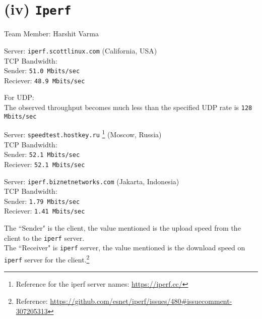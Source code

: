 \documentclass[11pt, fleqn]{article}
\begin{document}
\newpage
\section*{(iv) \texttt{Iperf}}
\label{partd}
\setcounter{equation}{0}

Team Member: Harshit Varma

\hrulefill
\smallskip


Server: \texttt{iperf.scottlinux.com} (California, USA)\\
TCP Bandwidth:\\
Sender: \texttt{51.0 Mbits/sec}\\
Reciever: \texttt{48.9 Mbits/sec}

For UDP:\\
The observed throughput becomes much less than the specified UDP rate is \texttt{128 Mbits/sec}

\hrulefill
\smallskip

Server: \texttt{speedtest.hostkey.ru} \footnote{Reference for the iperf server names: \url{https://iperf.cc/}} (Moscow, Russia)\\
TCP Bandwidth:\\
Sender: \texttt{52.1 Mbits/sec}\\
Reciever: \texttt{52.1 Mbits/sec}

\hrulefill
\smallskip

Server: \texttt{iperf.biznetnetworks.com} (Jakarta, Indonesia)\\
TCP Bandwidth:\\
Sender: \texttt{1.79 Mbits/sec}\\
Reciever: \texttt{1.41 Mbits/sec}

\hrulefill
\medskip

The ``Sender" is the client, the value mentioned is the upload speed from the client to the \texttt{iperf} server.\\
The ``Receiver" is \texttt{iperf} server, the value mentioned is the download speed on \texttt{iperf} server for the client.\footnote{Reference: \url{https://github.com/esnet/iperf/issues/480#issuecomment-307205313}}

\medskip
\end{document}
